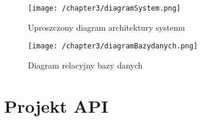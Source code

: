 \begin{figure}[!htb]
	\centering
	\texttt{[image: /chapter3/diagramSystem.png]}
	\caption{Uproszczony diagram architektury systemu}
	\label{fig:diagramSystem}
\end{figure}

\begin{figure}[!htb]
	\centering
	\texttt{[image: /chapter3/diagramBazydanych.png]}
	\caption{Diagram relacyjny bazy danych}
	\label{fig:diagramBazyDanych}
\end{figure}


\section{Projekt API}
